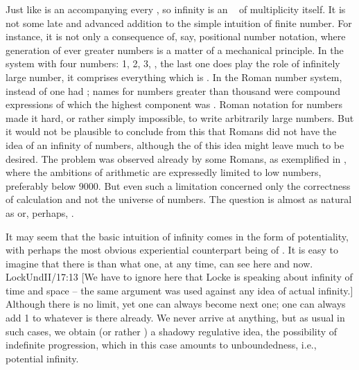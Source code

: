 Just like  is an  accompanying every ,
so infinity is an \equi\  of multiplicity itself. It is not some late and
advanced addition to the simple intuition of finite number. For instance, it is
not only a consequence of, say, positional number notation, where generation of
ever greater numbers is a matter of a mechanical principle.  In the system with
four numbers: 1, 2, 3, , the last one does play the role of infinitely
large number, it comprises everything which is . In the Roman
number system, 
instead of  one had ; names for numbers greater than
thousand were compound expressions of which the highest component was
. Roman notation for numbers made it hard, or rather simply
impossible, to write arbitrarily large numbers. But it would not be plausible to
conclude from this that Romans did not have the idea of an infinity of numbers,
although the  of this idea might leave much to be desired.  The
problem was observed already by some Romans, as exemplified in
\citeauthor*{Arithmetica}, where the ambitions of arithmetic are expressedly
limited to low numbers, preferably below 9000. But even such a limitation concerned only
the correctness of calculation and not the universe of numbers.  The question
  is almost as natural as  or, perhaps, .


\pa It may seem that the basic intuition of infinity comes in the form of
potentiality, with perhaps the most obvious experiential counterpart being
 of . It is easy to imagine that there is  than
what one, at any time, can see here and now.  \citet{[Y]et there be those who
  imagine they have positive ideas of infinite duration and space.  It would, I
  think, be enough to destroy any such positive idea of infinite, to ask him
  that has it,-- whether he could add to it or no; which would easily show the
  mistake of such a positive idea.}{LockUnd}{II/17:13 [We have to ignore here
  that Locke is speaking about infinity of time and space -- the same argument
  was used against any idea of actual infinity.]}  Although there is no
limit, yet one  can always become next one; one can always add 1
to whatever is there already. We never arrive at anything, but as usual in such
cases, we obtain (or rather ) a shadowy regulative idea, the
possibility of indefinite progression, which in this case amounts to
unboundedness, i.e., potential infinity.

